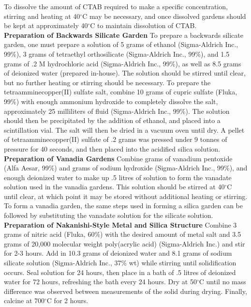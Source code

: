 \documentclass[
journal=jacsat, %
manuscript=article]{achemso}
\begin{document}
To dissolve the amount of CTAB required to make a specific concentration, stirring and heating at 40$^{\circ}$C may be necessary, and once dissolved gardens should be kept at approximately 40$^{\circ}$C to maintain dissolution of CTAB. \\
\textbf{Preparation of Backwards Silicate Garden} 
To prepare a backwards silicate garden, one must prepare a solution of 5 grams of ethanol (Sigma-Aldrich Inc., 99\%), 3 grams of tetraethyl orthosilicate (Sigma-Aldrich Inc., 99\%), and 1.5 grams of .2 M hydrochloric acid (Sigma-Aldrich Inc., 99\%), as well as 8.5 grams of deionized water (prepared in-house). The solution should be stirred until clear, but no further heating or stirring should be necessary. To prepare the tetraamminecopper(II) sulfate salt, combine 10 grams of cupric sulfate (Fluka, 99\%) with enough ammonium hydroxide to completely dissolve the salt, approximately 25 milliliters of fluid (Sigma-Aldrich Inc., 99\%). The solution should then be precipitated by the addition of ethanol, and placed into a scintillation vial. The salt will then be dried in a vacuum oven until dry. A pellet of tetraamminecopper(II) sulfate of .2 grams was pressed under 9 tonnes of pressure for 40 seconds, and then placed into the acidified silica solution.
~\\
\textbf{Preparation of Vanadia Gardens} 
Combine  grams of vanadium pentoxide (Alfa Aesar, 99\%) and  grams of sodium hydroxide (Sigma-Aldrich Inc., 99\%), and enough deionized water to make up .5 litres of solution to form the vanadate solution used in the vanadia gardens. This solution should be stirred at 40$^{\circ}$C until clear, at which point it may be stored without additional heating or stirring. To form a vanadia garden, the same steps used in forming a silica garden can be followed by substituting the vanadate solution for the silicate solution.
~\\
\textbf{Preparation of Nakanishi-Style Metal and Silica Structure} 
Combine 3 grams of nitric acid (Fluka, 60\%) with the desired amount of metal salt and 3.5 grams of 20,000 molecular weight poly(acrylic acid) (Sigma-Aldrich Inc.) and stir for 2-3 hours. Add in 10.3 grams of deionized water and 8.1 grams of sodium silicate solution (Sigma-Aldrich Inc., 37\% wt) while stirring until solidification occurs. Seal solution for 24 hours, then place in a bath of .5 litres of deionized water for 72 hours, refreshing the bath every 24 hours. Dry at 50$^{\circ}$C until no mass difference was observed between measurements of the solid during drying. Finally, calcine at 700$^{\circ}$C for 2 hours.~\cite{yachi_silica_2005}
~\\
\end{document}
